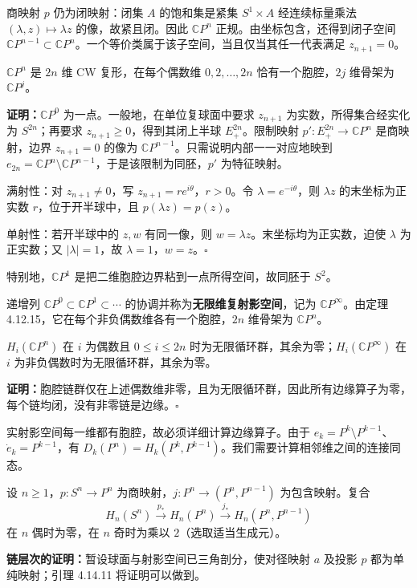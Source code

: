 商映射 $p$ 仍为闭映射：闭集 $A$ 的饱和集是紧集 $S^1\times A$ 经连续标量乘法 $(\lambda,z)\mapsto\lambda z$ 的像，故紧且闭。因此 $\mathbb CP^n$ 正规。由坐标包含，还得到闭子空间 $\mathbb CP^{n-1}\subset\mathbb CP^n$。一个等价类属于该子空间，当且仅当其任一代表满足 $z_{n+1}=0$。

$\mathbb CP^n$ 是 $2n$ 维 CW 复形，在每个偶数维 $0,2,\ldots,2n$ 恰有一个胞腔，$2j$ 维骨架为 $\mathbb CP^j$。

\textbf{证明：}$\mathbb CP^0$ 为一点。一般地，在单位复球面中要求 $z_{n+1}$ 为实数，所得集合经实化为 $S^{2n}$；再要求 $z_{n+1}\ge0$，得到其闭上半球 $E^{2n}_+$。限制映射 $p':E^{2n}_+\to\mathbb CP^n$ 是商映射，边界 $z_{n+1}=0$ 的像为 $\mathbb CP^{n-1}$。只需说明内部一一对应地映到 $e_{2n}=\mathbb CP^n\setminus\mathbb CP^{n-1}$，于是该限制为同胚，$p'$ 为特征映射。

满射性：对 $z_{n+1}\ne0$，写 $z_{n+1}=re^{i\theta}$，$r>0$。令 $\lambda=e^{-i\theta}$，则 $\lambda z$ 的末坐标为正实数 $r$，位于开半球中，且 $p(\lambda z)=p(z)$。

单射性：若开半球中的 $z,w$ 有同一像，则 $w=\lambda z$。末坐标均为正实数，迫使 $\lambda$ 为正实数；又 $|\lambda|=1$，故 $\lambda=1$，$w=z$。\hfill$\square$

特别地，$\mathbb CP^1$ 是把二维胞腔边界粘到一点所得空间，故同胚于 $S^2$。

递增列 $\mathbb CP^0\subset\mathbb CP^1\subset\cdots$ 的协调并称为\textbf{无限维复射影空间}，记为 $\mathbb CP^\infty$。由定理 4.12.15，它在每个非负偶数维各有一个胞腔，$2n$ 维骨架为 $\mathbb CP^n$。

$H_i(\mathbb CP^n)$ 在 $i$ 为偶数且 $0\le i\le2n$ 时为无限循环群，其余为零；$H_i(\mathbb CP^\infty)$ 在 $i$ 为非负偶数时为无限循环群，其余为零。

\textbf{证明：}胞腔链群仅在上述偶数维非零，且为无限循环群，因此所有边缘算子为零，每个链均闭，没有非零链是边缘。\hfill$\square$

实射影空间每一维都有胞腔，故必须详细计算边缘算子。由于 $e_k=P^k\setminus P^{k-1}$、$\dot e_k=P^{k-1}$，有 $D_k(P^n)=H_k(P^k,P^{k-1})$。我们需要计算相邻维之间的连接同态。

设 $n\ge1$，$p:S^n\to P^n$ 为商映射，$j:P^n\to(P^n,P^{n-1})$ 为包含映射。复合
\[
H_n(S^n)\xrightarrow{p_*}H_n(P^n)\xrightarrow{j_*}H_n(P^n,P^{n-1})
\]
在 $n$ 偶时为零，在 $n$ 奇时为乘以 $2$（选取适当生成元）。

\textbf{链层次的证明：}暂设球面与射影空间已三角剖分，使对径映射 $a$ 及投影 $p$ 都为单纯映射；引理 4.14.11 将证明可以做到。

